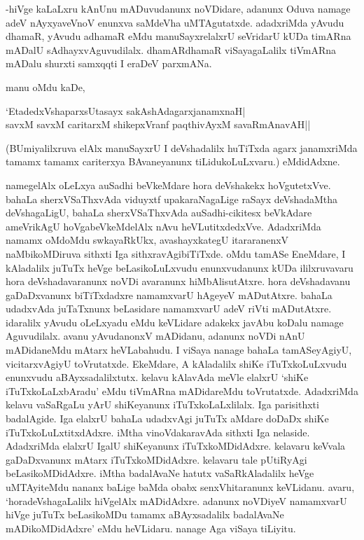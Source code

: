 -hiVge kaLaLxru kAnUnu mADuvudanunx noVDidare, adanunx Oduva namage adeV nAyxyaveVnoV enunxva saMdeVha uMTAgutatxde. adadxriMda yAvudu dhamaR, yAvudu adhamaR eMdu manuSayxrelalxrU seVridarU kUDa timARna mADalU sAdhayxvAguvudilalx. dhamARdhamaR viSayagaLalilx tiVmARna mADalu shurxti samxqqti I eraDeV parxmANa. 

manu oMdu kaDe,

\begin{shloka}
`EtadedxVshaparxsUtasayx sakAshAdagarxjanamxnaH|\\
savxM savxM caritarxM shikepxVranf paqthivAyxM savaRmAnavAH||
\end{shloka}

(BUmiyalilxruva elAlx manuSayxrU I deVshadalilx huTiTxda agarx janamxriMda tamamx tamamx cariterxya BAvaneyanunx tiLidukoLuLxvaru.) eMdidAdxne.

namegelAlx oLeLxya auSadhi beVkeMdare hora deVshakekx hoVgutetxVve. bahaLa sherxVSaThxvAda viduyxtf upakaraNagaLige raSayx deVshadaMtha deVshagaLigU, bahaLa sherxVSaThxvAda auSadhi-cikitesx beVkAdare ameVrikAgU hoVgabeVkeMdelAlx nAvu heVLutitxdedxVve. AdadxriMda namamx oMdoMdu swkayaRkUkx, avashayxkategU itararanenxV naMbikoMDiruva sithxti Iga sithxravAgibiTiTxde. oMdu tamASe EneMdare, I kAladalilx juTuTx heVge beLasikoLuLxvudu enunxvudanunx kUDa ililxruvavaru hora deVshadavaranunx noVDi avaranunx hiMbAlisutAtxre. hora deVshadavanu gaDaDxvanunx biTiTxdadxre namamxvarU hAgeyeV mADutAtxre. bahaLa udadxvAda juTaTxnunx beLasidare namamxvarU adeV riVti mADutAtxre. idaralilx yAvudu oLeLxyadu eMdu keVLidare adakekx javAbu koDalu namage Aguvudilalx. avanu yAvudanonxV mADidanu, adanunx noVDi nAnU mADidaneMdu mAtarx heVLabahudu. I viSaya nanage bahaLa tamASeyAgiyU, vicitarxvAgiyU toVrutatxde. EkeMdare, A kAladalilx shiKe iTuTxkoLuLxvudu enunxvudu aBAyxsadalilxtutx. kelavu kAlavAda meVle elalxrU `shiKe iTuTxkoLaLxbAradu' eMdu tiVmARna mADidareMdu toVrutatxde. AdadxriMda kelavu vaSaRgaLu yArU shiKeyanunx iTuTxkoLaLxlilalx. Iga parisithxti badalAgide. Iga elalxrU bahaLa udadxvAgi juTuTx aMdare doDaDx shiKe iTuTxkoLuLxtitxdAdxre. iMtha vinoVdakaravAda sithxti Iga nelaside. AdadxriMda elalxrU IgalU shiKeyanunx iTuTxkoMDidAdxre. kelavaru keVvala gaDaDxvanunx mAtarx iTuTxkoMDidAdxre. kelavaru tale pUtiRyAgi beLasikoMDidAdxre. iMtha badalAvaNe hatutx vaSaRkAladalilx heVge uMTAyiteMdu nananx baLige baMda obabx senxVhitaranunx keVLidanu. avaru, `horadeVshagaLalilx hiVgelAlx mADidAdxre. adanunx noVDiyeV namamxvarU hiVge juTuTx beLasikoMDu tamamx aBAyxsadalilx badalAvaNe mADikoMDidAdxre' eMdu heVLidaru. nanage Aga viSaya tiLiyitu. 

